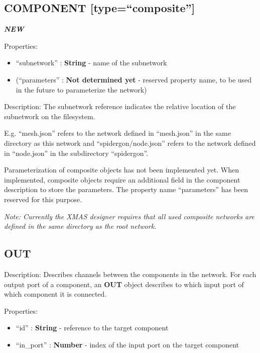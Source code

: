 \subsection{COMPONENT
{[}type=``composite''{]}}\label{component-typecomposite}

\textbf{\emph{NEW}}

Properties:

\begin{itemize}
\itemsep1pt\parskip0pt
\item
  ``subnetwork'' : \textbf{String} - name of the subnetwork
\item
  (``parameters'' : \textbf{Not determined yet} - reserved property
  name, to be used in the future to parameterize the network)
\end{itemize}

Description: The subnetwork reference indicates the relative location of
the subnetwork on the filesystem.

E.g. ``mesh.json'' refers to the network defined in ``mesh.json'' in the
same directory as this network and ``spidergon/node.json'' refers to the
network defined in ``node.json'' in the subdirectory ``spidergon''.

Parameterization of composite objects has not been implemented yet. When
implemented, composite objects require an additional field in the
component description to store the parameters. The property name
``parameters'' has been reserved for this purpose.

\emph{Note: Currently the XMAS designer requires that all used composite
networks are defined in the same directory as the root network.}

\subsection{OUT}\label{out}

Description: Describes channels between the components in the network.
For each output port of a component, an \textbf{OUT} object describes to
which input port of which component it is connected.

Properties:

\begin{itemize}
\itemsep1pt\parskip0pt
\item
  ``id'' : \textbf{String} - reference to the target component
\item
  ``in\_port'' : \textbf{Number} - index of the input port on the target
  component
\end{itemize}

